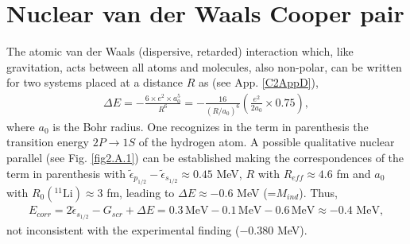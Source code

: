  \section{Nuclear van der Waals Cooper pair}\label{C2SG2}
 The atomic van der Waals (dispersive, retarded) interaction which, like gravitation,  acts between all atoms and molecules, also non-polar, can be written for two systems placed at a distance $R$ as (see App. \ref{C2AppD}), 
 \begin{align}\label{eq1C2AppG}
 \Delta E=-\frac{6\times e^2 \times a_0^5}{R^6}=-\frac{16}{(R/a_0)^6}\left(\frac{e^2}{2a_0}\times 0.75\right),
 \end{align}
 where $a_0$ is the Bohr radius. One recognizes in the term in parenthesis the transition energy $2P\to1S$ of the hydrogen atom. A possible qualitative nuclear parallel (see Fig. \ref{fig2.A.1})  can be established making the  correspondences  of the term in parenthesis with $\tilde\epsilon_{p_{1/2}}-\tilde\epsilon_{s_{1/2}}\approx0.45$ MeV, $R$ with $R_{eff}\approx4.6$ fm and $a_0$ with $R_0(^{11}\text{Li})\approx3$ fm, leading to $\Delta E\approx-0.6$ MeV (=$M_{ind}$).
  Thus,
 \begin{align*}
E_{corr}=2\tilde{\epsilon}_{s_{1/2}}-G_{scr}+\Delta E=0.3\,\text{MeV}-0.1\,\text{MeV}-0.6\,\text{MeV}\approx -0.4\text{ MeV},
 \end{align*} 
not inconsistent with the experimental finding ($-0.380$ MeV).

